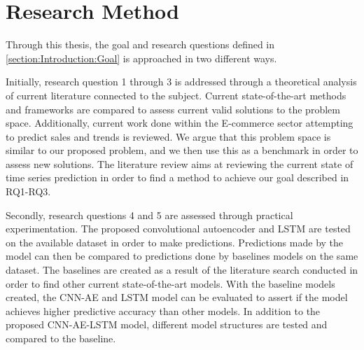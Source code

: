 \section{Research Method}
\label{section:Introduction:research-method}

Through this thesis, the goal and research questions defined in \autoref{section:Introduction:Goal} is approached in two different ways.

Initially, research question 1 through 3 is addressed through a theoretical analysis of current literature connected to the subject.
Current state-of-the-art methods and frameworks are compared to assess current valid solutions to the problem space.
Additionally, current work done within the E-commerce sector attempting to predict sales and trends is reviewed.
We argue that this problem space is similar to our proposed problem, and we then use this as a benchmark in order to assess new solutions.
The literature review aims at reviewing the current state of time series prediction in order to find a method to achieve our goal described in RQ1-RQ3.

Secondly, research questions 4 and 5 are assessed through practical experimentation.
The proposed convolutional autoencoder and LSTM are tested on the available dataset in order to make predictions.
Predictions made by the model can then be compared to predictions done by baselines models on the same dataset.
The baselines are created as a result of the literature search conducted in order to find other current state-of-the-art models.
With the baseline models created, the CNN-AE and LSTM model can be evaluated to assert if the model achieves higher predictive accuracy than other models.
In addition to the proposed CNN-AE-LSTM model,
different model structures are tested and compared to the baseline.



\iffalse
  This thesis approaches the goal and research questions through theoretical analysis
  of the problem space.
  Primarily the focus of this thesis is to conduct a review and analysis of current literature.
  Reviewing the current state-of-the-art methods for predictive analysis of time series,
  as well as new experimental methods and frameworks.
  Additionally, we review the current work done within the E-commerce sector attempting to predict sales and trends.
  We argue that this problem space is similar to our proposed problem, and we thus use this as a benchmark in order to assess new solutions.
  The literature review aims at reviewing the current state of time series prediction,
  in order to best find a method to achieve our goal described above.
\fi


